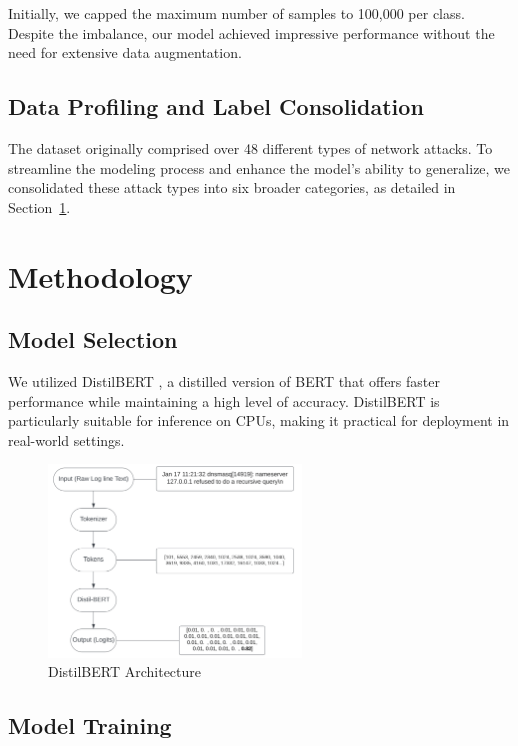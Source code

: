 \documentclass[12pt]{article}
\begin{document}
Initially, we capped the maximum number of samples to 100,000 per class. Despite the imbalance, our model achieved impressive performance without the need for extensive data augmentation.

\subsection{Data Profiling and Label Consolidation}

The dataset originally comprised over 48 different types of network attacks. To streamline the modeling process and enhance the model's ability to generalize, we consolidated these attack types into six broader categories, as detailed in Section~\ref{sec:methodology}.

\section{Methodology}
\label{sec:methodology}

\subsection{Model Selection}

We utilized DistilBERT \citep{sanh2019distilbert}, a distilled version of BERT that offers faster performance while maintaining a high level of accuracy. DistilBERT is particularly suitable for inference on CPUs, making it practical for deployment in real-world settings.

\begin{figure}[htbp]
    \centering
    \includegraphics[width=0.6\textwidth]{distil_bert.png}
    \caption{DistilBERT Architecture}
    \label{fig:distil_bert}
\end{figure}

\subsection{Model Training}
\end{document}
